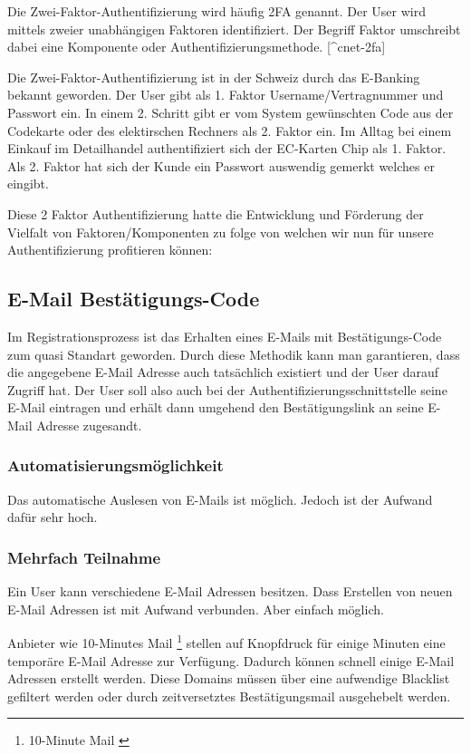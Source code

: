 Die Zwei-Faktor-Authentifizierung wird häufig 2FA genannt. Der User wird
mittels zweier unabhängigen Faktoren identifiziert. Der Begriff Faktor
umschreibt dabei eine Komponente oder Authentifizierungsmethode.
{[}\^{}cnet-2fa{]}

Die Zwei-Faktor-Authentifizierung ist in der Schweiz durch das E-Banking
bekannt geworden. Der User gibt als 1. Faktor Username/Vertragnummer und
Passwort ein. In einem 2. Schritt gibt er vom System gewünschten Code
aus der Codekarte oder des elektirschen Rechners als 2. Faktor ein. Im
Alltag bei einem Einkauf im Detailhandel authentifiziert sich der
EC-Karten Chip als 1. Faktor. Als 2. Faktor hat sich der Kunde ein
Passwort auswendig gemerkt welches er eingibt.

Diese 2 Faktor Authentifizierung hatte die Entwicklung und Förderung der
Vielfalt von Faktoren/Komponenten zu folge von welchen wir nun für
unsere Authentifizierung profitieren können:

\subsection{E-Mail Bestätigungs-Code}\label{e-mail-bestuxe4tigungs-code}

Im Registrationsprozess ist das Erhalten eines E-Mails mit
Bestätigungs-Code zum quasi Standart geworden. Durch diese Methodik kann
man garantieren, dass die angegebene E-Mail Adresse auch tatsächlich
existiert und der User darauf Zugriff hat. Der User soll also auch bei
der Authentifizierungsschnittstelle seine E-Mail eintragen und erhält
dann umgehend den Bestätigungslink an seine E-Mail Adresse zugesandt.

\subsubsection{Automatisierungsmöglichkeit}\label{automatisierungsmuxf6glichkeit}

Das automatische Auslesen von E-Mails ist möglich. Jedoch ist der
Aufwand dafür sehr hoch.

\subsubsection{Mehrfach Teilnahme}\label{mehrfach-teilnahme}

Ein User kann verschiedene E-Mail Adressen besitzen. Dass Erstellen von
neuen E-Mail Adressen ist mit Aufwand verbunden. Aber einfach möglich.

Anbieter wie 10-Minutes Mail \footnote{10-Minute Mail
  \autocite{10minutemail}} stellen auf Knopfdruck für einige Minuten
eine temporäre E-Mail Adresse zur Verfügung. Dadurch können schnell
einige E-Mail Adressen erstellt werden. Diese Domains müssen über eine
aufwendige Blacklist gefiltert werden oder durch zeitversetztes
Bestätigungsmail ausgehebelt werden.

